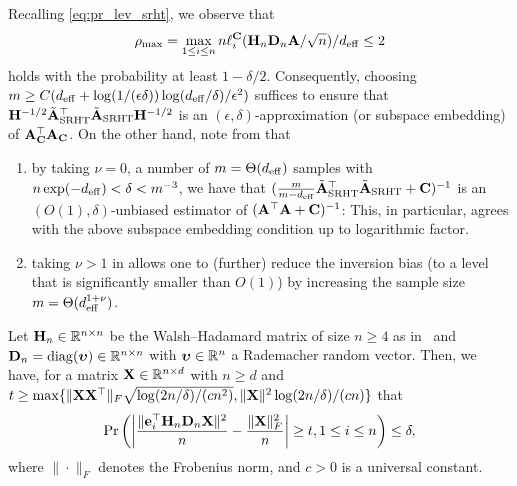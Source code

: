 \documentclass[11pt,a4paper]{article}
\begin{document}
\begin{remark}\normalfont\label{rem:sub_emb_srht}
Recalling \eqref{eq:pr_lev_srht},  we observe that
\begin{equation*}
     \rho_{\max} = \max_{1\leq i \leq n}n\ell^{\mathbf{C}}_i (\mathbf{H}_n \mathbf{D}_n \mathbf{A}/\sqrt{n})/d_{\mathrm{eff}} \leq 2
\end{equation*}
holds with the probability at least $1-\delta/2$. 
Consequently, choosing $m\geq C(d_{\mathrm{eff}}+\log(1/(\epsilon\delta))\log(d_{\mathrm{eff}}/\delta)/\epsilon^2)$ suffices to ensure that $\mathbf{H}^{-1/2}\tilde{\mathbf{A}}_{\rm SRHT}^\top \tilde{\mathbf{A}}_{\rm SRHT}\mathbf{H}^{-1/2}$ is an $(\epsilon,\delta)$-approximation (or subspace embedding) of $\mathbf{A}_{\mathbf{C}}^\top\mathbf{A}_{\mathbf{C}}$.
On the other hand, note from  that
\begin{enumerate}
    \item by taking $\nu = 0$, a number of $m=\Theta(d_{\mathrm{eff}})$ samples with $ n \exp(-d_{\mathrm{eff}}) < \delta < m^{-3}$, we have that $(\frac{m}{m-d_{\mathrm{eff}}}\tilde{\mathbf{A}}_{\rm SRHT}^\top \tilde{\mathbf{A}}_{\rm SRHT} + \mathbf{C} )^{-1}$ is an $(O(1),\delta)$-unbiased estimator of $(\mathbf{A}^\top  \mathbf{A} + \mathbf{C})^{-1}$: This, in particular, agrees with the above subspace embedding condition up to logarithmic factor.
    \item taking $\nu > 1$ in  allows one to (further) reduce the inversion bias (to a level that is significantly smaller than  $O(1)$) by increasing the sample size $m = \Theta(d_{\mathrm{eff}}^{1+\nu})$.
\end{enumerate}
\end{remark}

\begin{lemma}\label{lemm: HD_balance_row_norms} 
Let $\mathbf{H}_n\in {\mathbb{R}}^{n \times n}$ be the Walsh--Hadamard matrix of size $n\geq 4$ as in~  and $\mathbf{D}_n =\operatorname{diag}(\boldsymbol{\upsilon})\in {\mathbb{R}}^{n \times n}$ with $\boldsymbol{\upsilon}  \in {\mathbb{R}}^{n}$ a Rademacher random vector.
Then, we have, for a matrix $\mathbf{X}\in{\mathbb{R}}^{n\times d}$ with $n\geq d$ and $  t\geq \max\{\|\mathbf{X}\mathbf{X}^\top\|_F\sqrt{\log(2n/\delta)/(cn^2)},\|\mathbf{X}\|^2\log(2n/\delta)/(cn)\}$ that
\begin{align*}
    \Pr\left( \left|\frac{\|\mathbf{e}_i^\top\mathbf{H}_n\mathbf{D}_n\mathbf{X}\|^2}{n}-\frac{\|\mathbf{X}\|_F^2}{n}  \right|\geq t,1\leq i\leq n\right)\leq \delta,
\end{align*}
where $\|\cdot\|_F$ denotes the Frobenius norm, and $c>0$ is a universal constant. 
\end{lemma}
\end{document}
